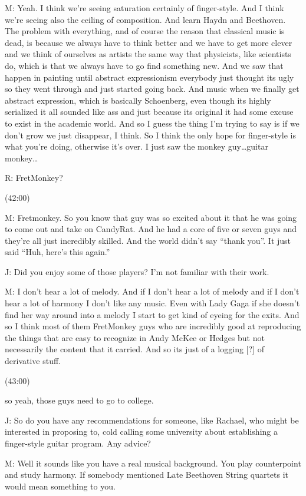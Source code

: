 \documentclass[11pt]{article}
\begin{document}
M: Yeah. I think we're seeing saturation certainly of finger-style. And I think we're seeing also the ceiling of composition. And learn Haydn and Beethoven. The problem with everything, and of course the reason that classical music is dead, is because we always have to think better and we have to get more clever and we think of ourselves as artists the same way that physicists, like scientists do, which is that we always have to go find something new. And we saw that happen in painting until abstract expressionism everybody just thought its ugly so they went through and just started going back. And music when we finally get abstract expression, which is basically Schoenberg, even though its highly serialized it all sounded like ass and just because its original it had some excuse to exist in the academic world. And so I guess the thing I'm trying to say is if we don't grow we just disappear, I think. So I think the only hope for finger-style is what you're doing, otherwise it's over. I just saw the monkey guy\ldots{}guitar monkey\ldots{}

R: FretMonkey?

(42:00)

M: Fretmonkey. So you know that guy was so excited about it that he was going to come out and take on CandyRat. And he had a core of five or seven guys and they're all just incredibly skilled. And the world didn't say ``thank you''. It just said ``Huh, here's this again.'' 

J: Did you enjoy some of those players? I'm not familiar with their work.

M: I don't hear a lot of melody. And if I don't hear a lot of melody and if I don't hear a lot of harmony I don't like any music. Even with Lady Gaga if she doesn't find her way around into a melody I start to get kind of eyeing for the exits. And so I think most of them FretMonkey guys who are incredibly good at reproducing the things that are easy to recognize in Andy McKee or Hedges but not necessarily the content that it carried. And so its just of a logging [?] of derivative stuff.   

(43:00)

so yeah, those guys need to go to college.

J: So do you have any recommendations for someone, like Rachael, who might be interested in proposing to, cold calling some university about establishing a finger-style guitar program. Any advice?

M: Well it sounds like you have a real musical background. You play counterpoint and study harmony. If somebody mentioned Late Beethoven String quartets it would mean something to you.
\end{document}
